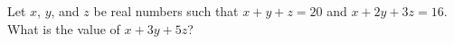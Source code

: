 Let $x$, $y$, and $z$ be real numbers such that $x+y+z=20$ and $x+2y+3z=16$. What is the value of $x+3y+5z$?
